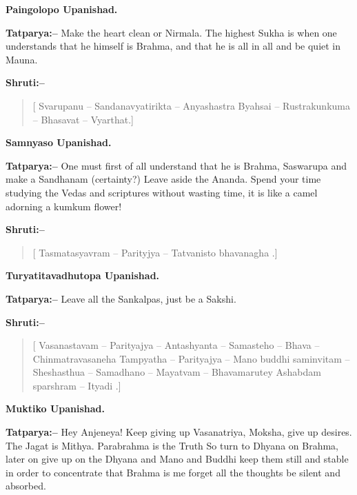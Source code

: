 \begin{flushright}
\textbf{Paingolopo Upanishad.}
\end{flushright}

\textbf{Tatparya:–} Make the heart clean or Nirmala. The highest Sukha is when one understands that he himself is Brahma, and that he is all in all and be quiet in Mauna.

\textbf{Shruti:–}

\begin{verse}
[ Svarupanu – Sandanavyatirikta – Anyashastra Byahsai – Rustrakunkuma – Bhasavat – Vyarthat.]
\end{verse}

\begin{flushright}
\textbf{Samnyaso Upanishad.}
\end{flushright}

\textbf{Tatparya:–} One must first of all understand that he is Brahma, Saswarupa and make a Sandhanam (certainty?) Leave aside the Ananda. Spend your time studying the Vedas and scriptures without wasting time, it is like a camel adorning a kumkum flower!

\textbf{Shruti:–}

\begin{verse}
[ Tasmatasyavram – Parityjya – Tatvanisto bhavanagha .]
\end{verse}

\begin{flushright}
\textbf{Turyatitavadhutopa Upanishad.}
\end{flushright}

\textbf{Tatparya:–} Leave all the Sankalpas, just be a Sakshi.

\textbf{Shruti:–}

\begin{verse}
[ Vasanastavam – Parityajya – Antashyanta – Samasteho – Bhava – Chinmatravasaneha  Tampyatha – Parityajya – Mano buddhi saminvitam – Sheshasthua – Samadhano – Mayatvam – Bhavamarutey  Ashabdam sparshram – Ityadi .]
\end{verse}

\begin{flushright}
\textbf{Muktiko Upanishad.}
\end{flushright}

\textbf{Tatparya:–} Hey Anjeneya! Keep giving up Vasanatriya, Moksha, give up desires. The Jagat is Mithya. Parabrahma is the Truth So turn to Dhyana on Brahma, later on give up on the Dhyana and Mano and Buddhi keep them still and stable in order to concentrate that Brahma is me forget all the thoughts be silent and absorbed.

